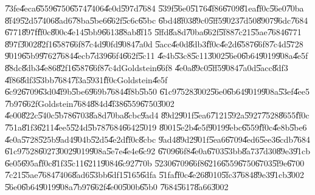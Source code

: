 \documentclass[12pt,a4paper]{article}
\begin{document}
\bigskip

\U{73fe}\U{4eca}\U{6559}\U{6750}\U{6574}\U{7406}\U{4e0d}\U{597d}\U{7684}%
\U{539f}\U{56e0}\U{5176}\U{4f86}\U{6709}\U{81ea}\U{ff0c}\U{56e0}\U{70ba}%
\U{8f49}\U{52d5}\U{7406}\U{8ad6}\U{78ba}\U{5be6}\U{662f}\U{5c6c}\U{65bc}%
\U{6bd4}\U{8f03}\U{89c0}\U{5ff5}\U{9023}\U{7d50}\U{8907}\U{96dc}\U{7684}%
\U{6771}\U{897f}\U{ff0c}\U{800c}\U{4e14}\U{5bb9}\U{6613}\U{88ab}\U{8f15}%
\U{5ffd}\U{8a8d}\U{70ba}\U{662f}\U{5f88}\U{7c21}\U{55ae}\U{7684}\U{6771}%
\U{897f}\U{3002}\U{82f1}\U{6587}\U{66f8}\U{7c4d}\U{90fd}\U{9084}\U{7a0d}%
\U{5acc}\U{4e0d}\U{8db3}\U{ff0c}\U{4e2d}\U{6587}\U{66f8}\U{7c4d}\U{5728}%
\U{9019}\U{65b9}\U{9762}\U{7684}\U{4ecb}\U{7d39}\U{66f4}\U{662f}\U{5c11}%
\U{4e4b}\U{53c8}\U{5c11}\U{3002}\U{56e0}\U{6b64}\U{9019}\U{908a}\U{4e5f}%
\U{88dc}\U{8db3}\U{4e86}\U{82f1}\U{6587}\U{66f8}\U{7c4d}Goldstein\U{66f8}%
\U{4e0a}\cite{goldstein}\U{89c0}\U{5ff5}\U{9084}\U{7a0d}\U{5acc}\U{8df3}%
\U{4f86}\U{8df3}\U{53bb}\U{7684}\U{7f3a}\U{5931}\U{ff0c}Goldstein\U{4e5f}%
\U{6c92}\U{6709}\U{63d0}\U{4f9b}\U{5be6}\U{969b}\U{7684}\U{4f8b}\U{5b50}%
\U{61c9}\U{7528}\U{3002}\U{56e0}\U{6b64}\U{9019}\U{908a}\U{53ef}\U{4ee5}%
\U{7b97}\U{662f}Goldstein\U{7684}\U{884d}\U{4f38}\U{6559}\U{6750}\U{3002}%
\U{4e00}\U{822c}\U{540c}\U{5b78}\U{6703}\U{8a8d}\U{70ba}\U{8cbc}\U{9ad4}%
\U{89d2}\U{901f}\U{5ea6}\U{7121}\U{592a}\U{5927}\U{7528}\U{8655}\U{ff0c}%
\U{751a}\U{81f3}\U{6211}\U{4ee5}\U{524d}\U{5b78}\U{7684}\U{6642}\U{5019}%
\U{8001}\U{5e2b}\U{4e5f}\U{9019}\U{9ebc}\U{6559}\U{ff0c}\U{4e8b}\U{5be6}%
\U{4e0a}\U{5728}\U{525b}\U{9ad4}\U{904b}\U{52d5}\U{4e2d}\U{ff0c}\U{8cbc}%
\U{9ad4}\U{89d2}\U{901f}\U{5ea6}\U{6709}\U{4ed6}\U{5ee3}\U{6cdb}\U{7684}%
\U{61c9}\U{7528}\U{6027}\U{3002}\U{9019}\U{908a}\U{5e7e}\U{4e4e}\U{6c92}%
\U{6709}\U{66f8}\U{4e0a}\U{6703}\U{53bb}\U{8a73}\U{7d30}\U{89e3}\U{91cb}%
\U{6e05}\U{695a}\U{ff0c}\U{81f3}\U{5c11}\U{6211}\U{9084}\U{6c92}\U{770b}%
\U{5230}\U{6709}\U{66f8}\U{6216}\U{6559}\U{6750}\U{6703}\U{5f9e}\U{6700}%
\U{7c21}\U{55ae}\U{7684}\U{7406}\U{8ad6}\U{53bb}\U{6df1}\U{5165}\U{6dfa}%
\U{51fa}\U{ff0c}\U{4e26}\U{8010}\U{5fc3}\U{7684}\U{89e3}\U{91cb}\U{3002}%
\U{56e0}\U{6b64}\U{9019}\U{908a}\U{7b97}\U{662f}\U{4e00}\U{500b}\U{65b0}%
\U{7684}\U{5617}\U{8a66}\U{3002}

\bigskip
\end{document}
